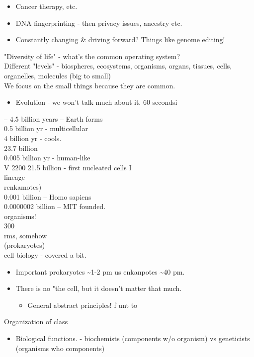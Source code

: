 \documentclass{article}
\begin{document}
\begin{itemize}
\item  Cancer therapy, etc.
\item  DNA fingerprinting - then privacy issues, ancestry etc.
\item  Constantly changing \& driving forward? Things like genome editing!
\end{itemize}
"Diversity of life" - what's the common operating system?\\
Different "levels" - biospheres, ecosystems, organisms, organs, tissues, cells,\\
organelles, molecules (big to small)\\
We focus on the small things because they are common.
\begin{itemize}
\item  Evolution - we won't talk much about it. 60 secondsi
\end{itemize}
– 4.5 billion years – Earth forms\\
0.5 billion yr - multicellular\\
4 billion yr - cools.\\
23.7 billion\\
0.005 billion yr - human-like\\
V 2200 21.5 billion - first nucleated cells I\\
lineage\\
renkamotes)\\
0.001 billion – Homo sapiens\\
0.0000002 billion – MIT founded.\\
organisms!\\
300\\
rms, somehow\\
(prokaryotes)\\
cell biology - covered a bit.
\begin{itemize}
\item  Important prokaryotes \textasciitilde1-2 pm us enkanpotes \textasciitilde40 pm.
\item  There is no "the cell, but it doesn't matter that much.
\begin{itemize}
\item  General abstract principles! f unt to
\end{itemize}
\end{itemize}
Organization of class
\begin{itemize}
\item  Biological functions. - biochemists (components w/o organism)
vs geneticists (organisms who components)
\end{itemize}
\end{document}

